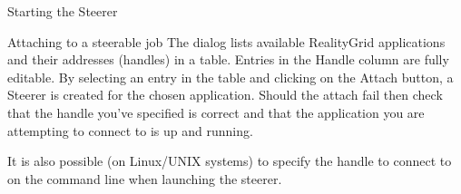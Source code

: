 \documentclass[a4paper,twoside]{article}
\begin{document}
\begin{section}{Starting the Steerer}
\begin{subsection}{Attaching to a steerable job}
The dialog lists available RealityGrid applications and their
addresses (handles) in a table. Entries in the Handle column are fully
editable.  By selecting an entry in the table and clicking on the
Attach button, a Steerer is created for the chosen application. Should
the attach fail then check that the handle you've specified is correct
and that the application you are attempting to connect to is up and
running.

It is also possible (on Linux/UNIX systems) to specify the handle to
connect to on the command line when launching the steerer.

\end{subsection}
\end{section}

\end{document}
